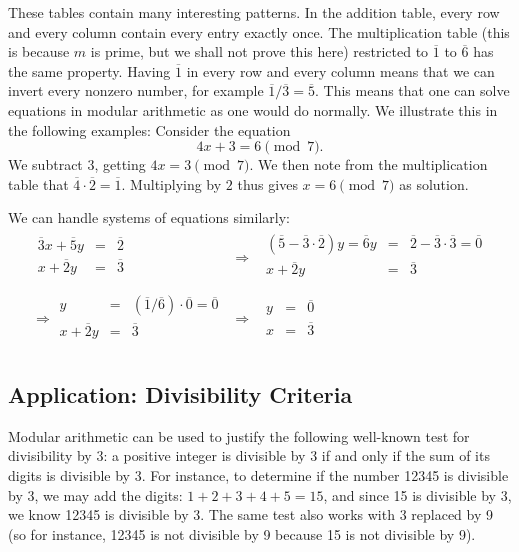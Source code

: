 These tables contain many interesting patterns. In the addition table, every row and
every column contain every entry exactly once. The multiplication table (this is because
$m$ is prime, but we shall not prove this here) restricted to $\overline{1}$ to $\overline{6}$ has the same property.
Having $\overline{1}$ in every row and every column means that we can invert every
nonzero number, for example $\overline{1}/\overline{3}=\overline{5}$. This means that
one can solve equations in modular arithmetic as one would do normally. We illustrate
this in the following examples:
\medskip
Consider the equation
\[
4x+3=6\pmod{7}.
\]
We subtract $3$, getting $4x=3\pmod{7}$. We then note from the multiplication table that
$\overline{4}\cdot\overline{2}=\overline{1}$. Multiplying by $2$ thus gives
$x=6\pmod{7}$ as solution.

We can handle systems of equations similarly:
\begin{eqnarray*}
\begin{array}{rcl}
\overline{3}x+\overline{5}y&=&\overline{2}\\
x+\overline{2}y&=&\overline{3}\\
\end{array}
&\Rightarrow&
\begin{array}{rcl}
(\overline{5}-\overline{3}\cdot\overline{2})y=\overline{6}y&=&\overline{2}-\overline{3}\cdot\overline{3}=\overline{0}\\
x+\overline{2}y&=&\overline{3}\\
\end{array}\\
\Rightarrow
\begin{array}{rcl}
y&=&(\overline{1}/\overline{6})\cdot\overline{0}=\overline{0}\\
x+\overline{2}y&=&\overline{3}\\
\end{array}
&\Rightarrow&
\begin{array}{rcl}
y&=&\overline{0}\\
x&=&\overline{3}\\
\end{array}
\end{eqnarray*}

\subsection{Application: Divisibility Criteria}


Modular arithmetic can be used to justify the following well-known test for divisibility by 3: a positive integer is divisible by 3 if and only if the sum of its digits is divisible by 3.
For instance, to determine if the number 12345 is divisible by 3, we may add the digits: $1+2+3+4+5 = 15$, and since 15 is divisible by 3, we know 12345 is divisible by 3.
The same test also works with 3 replaced by 9 (so for instance, 12345 is not divisible by 9 because 15 is not divisible by 9).

